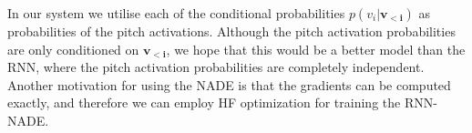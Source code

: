 	In our system we utilise each of the conditional probabilities $p(v_i|\mathbf{v_{<i}})$ as probabilities of the pitch activations. Although the pitch activation probabilities are only conditioned on $\mathbf{v_{<i}}$, we hope that this would be a better model than the RNN, where the pitch activation probabilities are completely independent. Another motivation for using the NADE is that the gradients can be computed exactly, and therefore we can employ HF optimization for training the RNN-NADE. 


	
	
	\subsection{}
	\label{subsec:rnn-nade}
	


